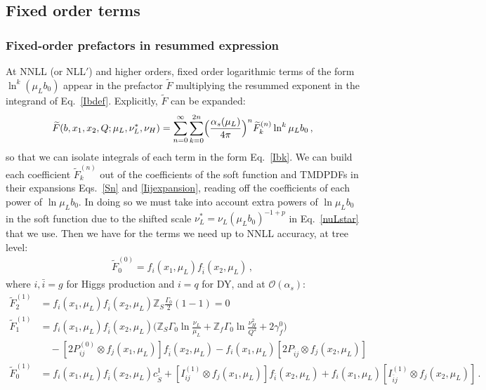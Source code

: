 \documentclass[a4,letterpaper,11pt]{article}
\newcommand{\nn}{\nonumber}
\newcommand{\be}{\begin{equation}}
\newcommand{\ee}{\end{equation}}
\newcommand{\as}{\alpha_s}
\newcommand{\cO}{\mathcal{O}}
\newcommand{\zed}{\mathbb{Z}}
\newcommand{\wt}{\widetilde}
\newcommand{\eq}[1]{Eq.~\eqref{#1}}
\newcommand{\eqs}[2]{Eqs.~\eqref{#1} and \eqref{#2}}
\begin{document}
\subsection{Fixed order terms}
\label{ssec:fixedorderlimit}

\subsubsection{Fixed-order prefactors in resummed expression}

At NNLL (or NLL$'$) and higher orders, fixed order logarithmic terms of the form $\ln^k(\mu_L b_0)$ appear in the prefactor $\wt F$ multiplying the resummed exponent in the integrand of \eq{Ibdef}. 
Explicitly, $\wt F$ can be expanded:
\be
\label{Fexpansion}
\wt F(b,x_1,x_2,Q;\mu_L,\nu_L^*,\nu_H) = \sum_{n=0}^\infty \sum_{k=0}^{2n} \Bigl(\frac{\as(\mu_L)}{4\pi}\Bigr)^n \wt F^{(n)}_k \ln^k\mu_L b_0\,,
\ee
so that we can isolate integrals of each term in the form \eq{Ibk}. We can build each coefficient $\wt F^{(n)}_k$  out of the coefficients of the soft function and TMDPDFs  in their expansions \eqs{Sn}{Iijexpansion}, reading off the coefficients of each power of $\ln\mu_L b_0$. In doing so we must take into account extra powers of $\ln\mu_L b_0$ in the soft function due to the shifted scale $\nu_L^* = \nu_L(\mu_L b_0)^{-1+p}$ in \eq{nuLstar} that we use. Then we have for the terms we need up to NNLL accuracy,
at tree level:
\begin{align}
\label{Ftree}
\wt F^{(0)}_0 = f_i(x_1,\mu_L) f_{\bar i}(x_2,\mu_L)\,,
\end{align}
where $i,\bar i = g$ for Higgs production and $i=q$ for DY,
and at $\cO(\as)$:
\begin{align}
\label{Foneloop}
\wt F^{(1)}_2 &= f_i(x_1,\mu_L) f_{\bar i}(x_2,\mu_L)  \zed_S \frac{\Gamma_0}{2} (1-1) = 0 \\
\wt F^{(1)}_1 &= f_i(x_1,\mu_L) f_{\bar i}(x_2,\mu_L) \biggl( \zed_S \Gamma_0 \ln\frac{\nu_L}{\mu_L} + \zed_f \Gamma_0 \ln\frac{\nu_H^2}{Q^2} +  2\gamma_f^0\biggr) \nn \\
&\quad - [2P_{ij}^{(0)}\otimes f_j(x_1,\mu_L)] f_{\bar i}(x_2,\mu_L) -  f_i(x_1,\mu_L) [2P_{\bar i j} \otimes f_j(x_2,\mu_L)] \nn \\
\wt F^{(1)}_0 &= f_i(x_1,\mu_L) f_{\bar i}(x_2,\mu_L) c_{\wt S}^1 + [I_{ij}^{(1)}\otimes f_j(x_1,\mu_L)] f_{\bar i}(x_2,\mu_L) + f_i(x_1,\mu_L)[ I_{\bar i j}^{(1)}\otimes f_j(x_2,\mu_L)]\,. \nn
\end{align}
\end{document}
